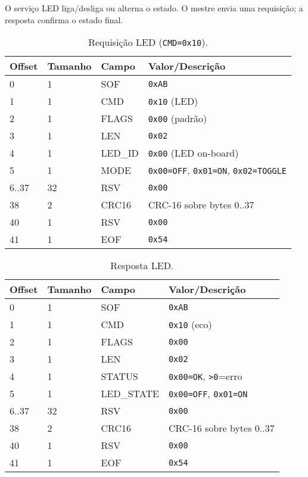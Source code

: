 O servi\c{c}o LED liga/desliga ou alterna o estado. O mestre envia uma
requisi\c{c}\~ao; a resposta confirma o estado final.

\begin{table}[h]
  \centering
  \caption{Requisi\c{c}\~ao LED (\texttt{CMD=0x10}).}
  \label{tab:spi-led-req}
  \setlength{\tabcolsep}{4pt}\footnotesize
  \begin{tabularx}{\textwidth}{lllX}
    \toprule
    Offset & Tamanho & Campo & Valor/Descri\c{c}\~ao \\
    \midrule
    0 & 1 & SOF & \texttt{0xAB} \\
    1 & 1 & CMD & \texttt{0x10} (LED) \\
    2 & 1 & FLAGS & \texttt{0x00} (padr\~ao) \\
    3 & 1 & LEN & \texttt{0x02} \\
    4 & 1 & LED\_ID & \texttt{0x00} (LED on-board) \\
    5 & 1 & MODE & \texttt{0x00=OFF}, \texttt{0x01=ON}, \texttt{0x02=TOGGLE} \\
    6..37 & 32 & RSV & \texttt{0x00} \\
    38 & 2 & CRC16 & CRC-16 sobre bytes 0..37 \\
    40 & 1 & RSV & \texttt{0x00} \\
    41 & 1 & EOF & \texttt{0x54} \\
    \bottomrule
  \end{tabularx}
\end{table}

\begin{table}[h]
  \centering
  \caption{Resposta LED.}
  \label{tab:spi-led-rsp}
  \setlength{\tabcolsep}{4pt}\footnotesize
  \begin{tabularx}{\textwidth}{lllX}
    \toprule
    Offset & Tamanho & Campo & Valor/Descri\c{c}\~ao \\
    \midrule
    0 & 1 & SOF & \texttt{0xAB} \\
    1 & 1 & CMD & \texttt{0x10} (eco) \\
    2 & 1 & FLAGS & \texttt{0x00} \\
    3 & 1 & LEN & \texttt{0x02} \\
    4 & 1 & STATUS & \texttt{0x00=OK}, \texttt{\textgreater 0}=erro \\
    5 & 1 & LED\_STATE & \texttt{0x00=OFF}, \texttt{0x01=ON} \\
    6..37 & 32 & RSV & \texttt{0x00} \\
    38 & 2 & CRC16 & CRC-16 sobre bytes 0..37 \\
    40 & 1 & RSV & \texttt{0x00} \\
    41 & 1 & EOF & \texttt{0x54} \\
    \bottomrule
  \end{tabularx}
\end{table}

